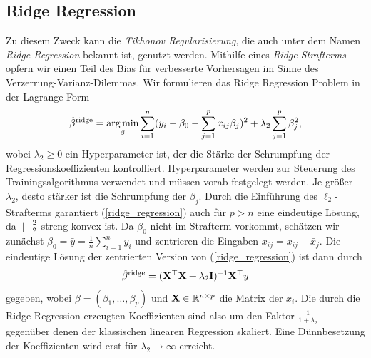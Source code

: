 

\subsection{Ridge Regression}

Zu diesem Zweck kann die \textit{Tikhonov Regularisierung}, die auch unter dem Namen \textit{Ridge Regression} bekannt ist, genutzt werden. Mithilfe eines \textit{Ridge-Strafterms} opfern wir einen Teil des Bias für verbesserte Vorhersagen im Sinne des Verzerrung-Varianz-Dilemmas. Wir formulieren das Ridge Regression Problem in der Lagrange Form
\begin{align}
\label{ridge_regression}
\hat{\beta}^{\text{ridge}} = \operatorname*{arg\,min}_{\beta} \sum_{i=1}^{n}(y_i - \beta_0 - \sum_{j=1}^p x_{ij}\beta_j)^2 + \lambda_2\sum_{j=1}^p \beta_j^2,
\end{align}
wobei $\lambda_2 \geq 0$ ein Hyperparameter ist, der die Stärke der Schrumpfung der Regressionskoeffizienten kontrolliert. Hyperparameter werden zur Steuerung des Trainingsalgorithmus verwendet und müssen vorab festgelegt werden. Je größer $\lambda_2$, desto stärker ist die Schrumpfung der $\beta_j$. Durch die Einführung des $\ell_2$-Strafterms garantiert (\ref{ridge_regression}) auch für $p > n$ eine eindeutige Lösung, da $\left\lVert \cdot \right\rVert_{2}^{2}$ streng konvex ist. Da $\beta_0$ nicht im Strafterm vorkommt, schätzen wir zunächst $\beta_0 = \bar{y} = \frac{1}{n}\sum_{i=1}^{n} y_i$ und zentrieren die Eingaben $x_{ij} = x_{ij} - \bar{x}_j$. Die eindeutige Lösung der zentrierten Version von (\ref{ridge_regression}) ist dann durch
\begin{align}
\hat{\beta}^{\text{ridge}}  = (\mathbf{X}^{\top} \mathbf{X} + \lambda_2\mathbf{I})^{-1}\mathbf{X}^{\top}y
\end{align}
gegeben, wobei $\beta = (\beta_1, \ldots, \beta_p)$ und $\mathbf{X} \in \mathbb{R}^{n \times p}$ die Matrix der $x_i$. Die durch die Ridge Regression erzeugten Koeffizienten sind also um den Faktor $\frac{1}{1+\lambda_2}$ gegenüber denen der klassischen linearen Regression skaliert. Eine Dünnbesetzung der Koeffizienten wird erst für $\lambda_2 \to \infty$ erreicht.




